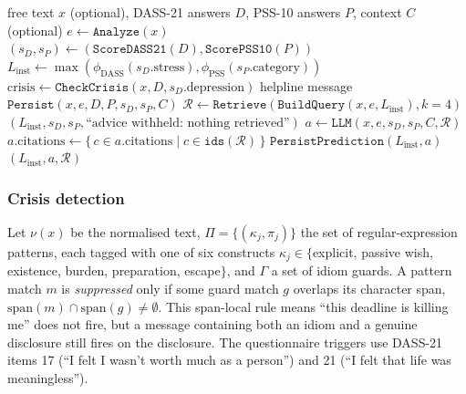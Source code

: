 \begin{algorithm}[H]
	\small
	\caption{$(\text{Response}) \gets \texttt{RunFullAssessment}(x, D, P, C)$}
	\label{alg:pipeline}
	\begin{algorithmic}[1]
		\Require free text $x$ (optional), DASS-21 answers $D$, PSS-10 answers $P$, context $C$ (optional)
		\State $e \gets \texttt{Analyze}(x)$ 
		\State $(s_D, s_P) \gets (\texttt{ScoreDASS21}(D), \texttt{ScorePSS10}(P))$
		\State $L_{\text{inst}} \gets \max(\phi_{\text{DASS}}(s_D.\text{stress}), \phi_{\text{PSS}}(s_P.\text{category}))$
		\State $\text{crisis} \gets \texttt{CheckCrisis}(x, D, s_D.\text{depression})$ 
		\State \Return helpline message 
		\EndIf
		\State $\texttt{Persist}(x, e, D, P, s_D, s_P, C)$
		\State $\mathcal{R} \gets \texttt{Retrieve}(\texttt{BuildQuery}(x, e, L_{\text{inst}}), k{=}4)$ 
		\State \Return $(L_{\text{inst}}, s_D, s_P, \text{``advice withheld: nothing retrieved''})$
		\EndIf
		\State $a \gets \texttt{LLM}(x, e, s_D, s_P, C, \mathcal{R})$ 
		\State $a.\text{citations} \gets \{\, c \in a.\text{citations} \mid c \in \texttt{ids}(\mathcal{R}) \,\}$
		\State $\texttt{PersistPrediction}(L_{\text{inst}}, a)$
		\State \Return $(L_{\text{inst}}, a, \mathcal{R})$
	\end{algorithmic}
\end{algorithm}

\subsubsection{Crisis detection}
Let $\nu(x)$ be the normalised text, $\Pi=\{(\kappa_j, \pi_j)\}$ the set of regular-expression patterns, each tagged with one of six constructs $\kappa_j \in \{$explicit, passive wish, existence, burden, preparation, escape$\}$, and $\Gamma$ a set of idiom guards. A pattern match $m$ is \textit{suppressed} only if some guard match $g$ overlaps its character span, $\mathrm{span}(m)\cap\mathrm{span}(g)\neq\emptyset$. This span-local rule means ``this deadline is killing me'' does not fire, but a message containing both an idiom and a genuine disclosure still fires on the disclosure. The questionnaire triggers use DASS-21 items 17 (``I felt I wasn't worth much as a person'') and 21 (``I felt that life was meaningless'').

